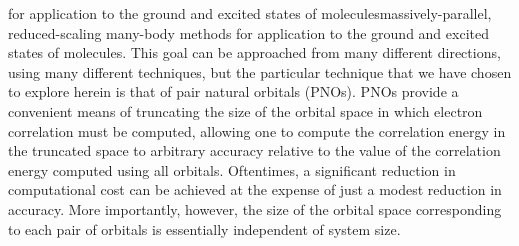 for application
to the ground and excited states of moleculesmassively-parallel, reduced-scaling
many-body methods for application to the ground and excited states of
molecules. This goal can be approached from many different directions,
using many different techniques, but the particular technique that we have
chosen to explore herein is that of pair natural orbitals (PNOs). PNOs
provide a convenient means of truncating the size of the orbital space
in which electron correlation must be computed, allowing one to compute
the correlation energy in the truncated space to arbitrary accuracy relative
to the value of the correlation energy computed using all orbitals.
Oftentimes, a significant reduction in computational cost can be achieved
at the expense of just a modest reduction in accuracy. More importantly, however,
the size of the orbital space corresponding to each pair of orbitals is
essentially independent of system size.